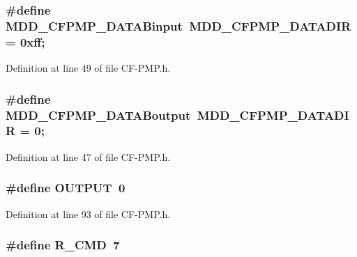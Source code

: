 \subsubsection[{M\+D\+D\+\_\+\+C\+F\+P\+M\+P\+\_\+\+D\+A\+T\+A\+Binput}]{\setlength{\rightskip}{0pt plus 5cm}\#define M\+D\+D\+\_\+\+C\+F\+P\+M\+P\+\_\+\+D\+A\+T\+A\+Binput~M\+D\+D\+\_\+\+C\+F\+P\+M\+P\+\_\+\+D\+A\+T\+A\+D\+I\+R = 0xff;}\label{_c_f-_p_m_p_8h_a12ec93c6367f94fb57e27273173baaf8}


Definition at line 49 of file C\+F-\/\+P\+M\+P.\+h.

\hypertarget{_c_f-_p_m_p_8h_a01e988e1c07e239b6c9d0dd2f128141c}{}
\subsubsection[{M\+D\+D\+\_\+\+C\+F\+P\+M\+P\+\_\+\+D\+A\+T\+A\+Boutput}]{\setlength{\rightskip}{0pt plus 5cm}\#define M\+D\+D\+\_\+\+C\+F\+P\+M\+P\+\_\+\+D\+A\+T\+A\+Boutput~M\+D\+D\+\_\+\+C\+F\+P\+M\+P\+\_\+\+D\+A\+T\+A\+D\+I\+R = 0;}\label{_c_f-_p_m_p_8h_a01e988e1c07e239b6c9d0dd2f128141c}


Definition at line 47 of file C\+F-\/\+P\+M\+P.\+h.

\hypertarget{_c_f-_p_m_p_8h_a61a3c9a18380aafb6e430e79bf596557}{}
\subsubsection[{O\+U\+T\+P\+U\+T}]{\setlength{\rightskip}{0pt plus 5cm}\#define O\+U\+T\+P\+U\+T~0}\label{_c_f-_p_m_p_8h_a61a3c9a18380aafb6e430e79bf596557}


Definition at line 93 of file C\+F-\/\+P\+M\+P.\+h.

\hypertarget{_c_f-_p_m_p_8h_acc6fa55e6ee7e4b6adc5fdc8928b5dd9}{}
\subsubsection[{R\+\_\+\+C\+M\+D}]{\setlength{\rightskip}{0pt plus 5cm}\#define R\+\_\+\+C\+M\+D~7}\label{_c_f-_p_m_p_8h_acc6fa55e6ee7e4b6adc5fdc8928b5dd9}


